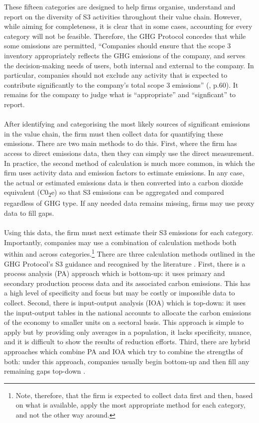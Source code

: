 \documentclass[12pt,twoside]{report}
\begin{document}
These fifteen categories are designed to help firms organise, understand and report on the diversity of S3 activities throughout their value chain. However, while aiming for completeness, it is clear that in some cases, accounting for every category will not be feasible.  Therefore, the GHG Protocol concedes that while some omissions are permitted, ``Companies should ensure that the scope 3 inventory appropriately reflects the GHG emissions of the company, and serves the decision-making needs of users, both internal and external to the company. In particular, companies should not exclude any activity that is expected to contribute significantly to the company's total scope 3 emissions'' (\cite{ghgscope32013}, p.60). It remains for the company to judge what is ``appropriate'' and ``signficant'' to report. 
\\ \\
After identifying and categorising the most likely sources of significant emissions in the value chain, the firm must then collect data for quantifying these emissions. There are two main methods to do this. First, where the firm has access to direct emissions data, then they can simply use the direct measurement. In practice, the second method of calculation is much more common, in which the firm uses activity data and emission factors to estimate emissions. In any case, the actual or estimated emissions data is then converted into a carbon dioxide equivalent (C0\textsubscript{2}e) so that S3 emissions can be aggregated and compared regardless of GHG type. If any needed data remains missing, firms may use proxy data to fill gaps. 
\\ \\
Using this data, the firm must next estimate their S3 emissions for each category. Importantly, companies may use a combination of calculation methods both within and across categories.\footnote{Note, therefore, that the firm is expected to collect data first and then, based on what is available, apply the most appropriate method for each category, and not the other way around.} There are three calculation methods outlined in the GHG Protocol's S3 guidance and recognised by the literature \cite{ghgscope32013, GoldhammerEtAl2017}. First, there is a process analysis (PA) approach which is bottom-up: it uses primary and secondary production process data and its associated carbon emissions. This has a high level of specificity and focus but may be costly or impossible data to collect. Second, there is input-output analysis (IOA) which is top-down: it uses the input-output tables in the national accounts to allocate the carbon emissions of the economy to smaller units on a sectoral basis. This approach is simple to apply but by providing only averages in a population, it lacks specificity, nuance, and it is difficult to show the results of reduction efforts. Third, there are hybrid approaches which combine PA and IOA which try to combine the strengths of both: under this approach, companies usually begin bottom-up and then fill any remaining gaps top-down \cite{Crawford2008}. 
\end{document}
